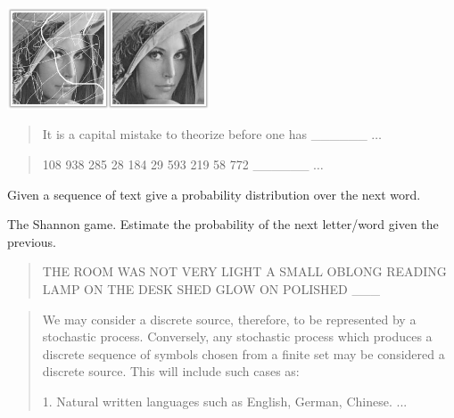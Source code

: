 \documentclass{beamer}
\newcommand{\air}{\vspace{0.25cm}}
\begin{document}
\begin{frame}

  \begin{center}
    \includegraphics[width=6cm]{lena}
  \end{center}

  \air
   {
    \begin{quote}
    It is a capital mistake to theorize before one has \_\_\_\_\_\_ $\ldots$ 
    \end{quote}
  }
   {
    \begin{quote}
      108 938 285 28 184 29 593 219 58 772 \_\_\_\_\_\_ $\ldots$ 
    \end{quote}    
  }
\end{frame}



\begin{frame}
  \begin{center}
  \end{center}
  Given a sequence of text give a probability distribution 
  over the next word. 

\air

  The Shannon game. Estimate the probability of the next letter/word
  given the previous.

  \begin{quote}
    THE ROOM WAS NOT VERY LIGHT A SMALL OBLONG READING LAMP ON THE
    DESK SHED GLOW ON POLISHED \_\_\_\
  \end{quote}


\end{frame}


\begin{frame}
  \begin{center}
  \end{center}
\air
  
\begin{quote}  
  We may consider a discrete source, therefore,
to be represented by a stochastic process. Conversely, any stochastic
process which produces a discrete sequence of symbols chosen from a finite
set may be considered a discrete source. This will include such cases as:

1. Natural written languages such as English, German, Chinese.
...
\end{quote}
\end{frame}
\end{document}
